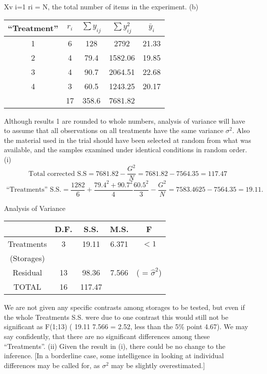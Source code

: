 \documentclass[a4paper,12pt]{article}
\begin{document}
Xv
i=1
ri = N,
the total number of items in the experiment.
(b)
\begin{center}
\begin{tabular}{|c|c|c|c|c|}
“Treatment” & $r_i$ & $\sum 
y_{ij}$ & $\sum 
y^2_{ij}$ & $\bar{y}_i$\\ \hline

1	&	6	&	128	&	2792	&	21.33	\\ \hline
2	&	4	&	79.4	&	1582.06	&	19.85	\\ \hline
3	&	4	&	90.7	&	2064.51	&	22.68	\\ \hline
4	&	3	&	60.5	&	1243.25	&	20.17	\\ \hline
	&	17	&	358.6	&	7681.82	&		\\ \hline
\end{tabular}
\end{center}

Although results 1 are rounded to whole numbers, analysis of variance will have to assume that all observations on all treatments have the same variance $\sigma^2$. Also the material used in the trial should have been selected at
random from what was available, and the samples examined under identical conditions in random order.
(i) 
\[\mbox{Total corrected S.S} = 7681.82-\frac{G^2}{N} = 7681.82- 7564.35 = 117.47\]
\[\mbox{ “Treatments” S.S.} = \frac{1282}{6} + \frac{79.4^2 + 90.7^2}{4} \frac{60.5^2}{3}-\frac{G^2}{N}
= 7583.4625 - 7564.35 = 19.11.\]

Analysis of Variance 
\begin{center}
\begin{tabular}{|c|c|c|c|c|}\hline
 & D.F.&  S.S.&  M.S. &  F \\\hline
Treatments &  3&  19.11 & 6.371 &  $< 1$\\
(Storages) & &&&\\ \hline
Residual & 13 & 98.36&  7.566& ( = $\hat{\sigma}^2$)\\ \hline
TOTAL & 16 & 117.47 & & \\ \hline
\end{tabular}
\end{center}


We are not given any specific contrasts among storages to be tested, but
even if the whole Treatments S.S. were due to one contrast this would still
not be significant as F(1;13) ( 19.11
7.566 = 2.52, less than the 5\% point 4.67). We
may say confidently, that there are no significant differences among these
“Treatments”.
(ii) Given the result in (i), there could be no change to the inference. [In a
borderline case, some intelligence in looking at individual differences may be
called for, as $\sigma^2$ may be slightly overestimated.]
\end{document}
